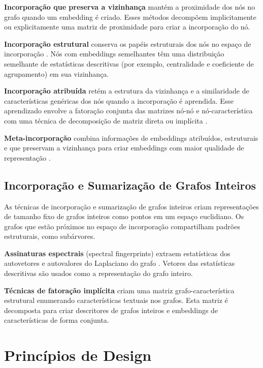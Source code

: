 \documentclass[sigconf]{acmart}
\begin{document}
\textbf{Incorporação que preserva a vizinhança} mantém a proximidade dos nós no grafo quando um embedding é criado. Esses métodos decompõem implicitamente \cite{DeepWalk, Walklets, Diff2Vec} ou explicitamente \cite{GraRep, BoostNE, NetMF, NMF-ADMM} uma matriz de proximidade para criar a incorporação do nó.

\textbf{Incorporação estrutural} conserva os papéis estruturais dos nós no espaço de incorporação \cite{Role2Vec, GraphWave, RolX}. Nós com embeddings semelhantes têm uma distribuição semelhante de estatísticas descritivas (por exemplo, centralidade e coeficiente de agrupamento) em sua vizinhança.

\textbf{Incorporação atribuída} retém a estrutura da vizinhança e a similaridade de características genéricas dos nós quando a incorporação é aprendida. Esse aprendizado envolve a fatoração conjunta das matrizes nó-nó e nó-característica com uma técnica de decomposição de matriz direta \cite{TADW, BANE} ou implícita \cite{MUSAE, SINE}.

\textbf{Meta-incorporação} combina informações de embeddings atribuídos, estruturais e que preservam a vizinhança para criar embeddings com maior qualidade de representação \cite{FastNetworkEmbedding}.

\subsection{Incorporação e Sumarização de Grafos Inteiros}

As técnicas de incorporação e sumarização de grafos inteiros criam representações de tamanho fixo de grafos inteiros como pontos em um espaço euclidiano. Os grafos que estão próximos no espaço de incorporação compartilham padrões estruturais, como subárvores.

\textbf{Assinaturas espectrais} (spectral fingerprints) extraem estatísticas dos autovetores e autovalores do Laplaciano do grafo \cite{graph_classification_baseline, NetLSD, FGSD}. Vetores das estatísticas descritivas são usados como a representação do grafo inteiro.

\textbf{Técnicas de fatoração implícita} criam uma matriz grafo-característica estrutural \cite{GL2Vec, Graph2Vec} enumerando características textuais nos grafos. Esta matriz é decomposta para criar descritores de grafos inteiros e embeddings de características de forma conjunta.

\section{Princípios de Design}
\end{document}
